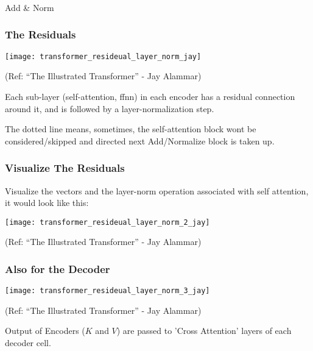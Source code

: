 \begin{frame}[fragile]\frametitle{}
\begin{center}
{\Large Add \& Norm}
\end{center}
\end{frame}

\begin{frame}[fragile]\frametitle{The Residuals}


\begin{center}
\texttt{[image: transformer\_resideual\_layer\_norm\_jay]}


{\tiny (Ref: ``The Illustrated Transformer'' - Jay Alammar)}
\end{center}		

Each sub-layer (self-attention, ffnn) in each encoder has a residual connection around it, and is followed by a layer-normalization step.

The dotted line means, sometimes, the self-attention block wont be considered/skipped and directed next Add/Normalize block is taken up.

\end{frame}

\begin{frame}[fragile]\frametitle{Visualize The Residuals}

Visualize the vectors and the layer-norm operation associated with self attention, it would look like this:

\begin{center}
\texttt{[image: transformer\_resideual\_layer\_norm\_2\_jay]}


{\tiny (Ref: ``The Illustrated Transformer'' - Jay Alammar)}
\end{center}		

\end{frame}

\begin{frame}[fragile]\frametitle{Also for the Decoder}

\begin{center}
\texttt{[image: transformer\_resideual\_layer\_norm\_3\_jay]}


{\tiny (Ref: ``The Illustrated Transformer'' - Jay Alammar)}
\end{center}		

Output of Encoders ($K$ and $V$) are passed to 'Cross Attention' layers of each decoder cell.

\end{frame}



